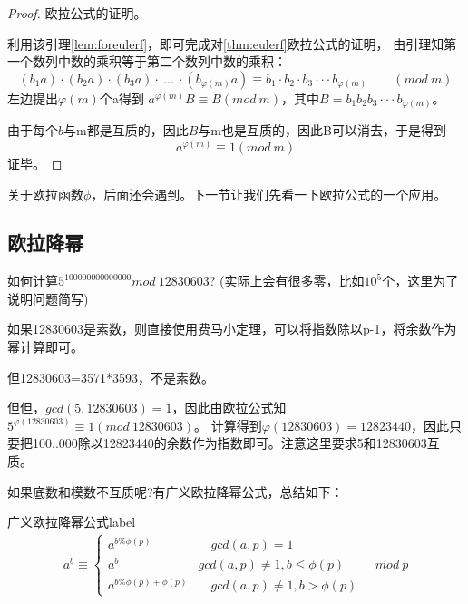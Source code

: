 \begin{proof}
欧拉公式的证明。

利用该引理\ref{lem:foreulerf}，即可完成对\ref{thm:eulerf}欧拉公式的证明，
由引理知第一个数列中数的乘积等于第二个数列中数的乘积：
$$
(b_1a)\cdot (b_2a)\cdot (b_3a)\cdot \ ...\ \cdot (b_{\varphi(m)}a) \equiv b_1\cdot b_2\cdot b_3 \cdot \cdot \cdot b_{\varphi(m)} \qquad  (mod\ m)
$$
左边提出$\varphi(m)$个a得到  $a^{\varphi(m)}B\equiv B (mod\ m)$，其中$B= b_1 b_2 b_3 \cdot \cdot \cdot b_{\varphi(m)} $。

由于每个$b$与m都是互质的，因此$B$与m也是互质的，因此B可以消去，于是得到
$$
a^{\varphi(m)}\equiv 1 (mod\ m)
$$
证毕。
\end{proof}

关于欧拉函数$\phi$，后面还会遇到。下一节让我们先看一下欧拉公式的一个应用。

\subsection{欧拉降幂}
如何计算$5^{100000000000000}mod\ 12830603$? (实际上会有很多零，比如$10^5$个，这里为了说明问题简写)

如果12830603是素数，则直接使用费马小定理，可以将指数除以p-1，将余数作为幂计算即可。

但12830603=3571*3593，不是素数。

但但，$gcd(5,12830603)=1$，因此由欧拉公式知$5^{\varphi(12830603)}\equiv 1 (mod \ 12830603)$。
计算得到$\varphi(12830603)=12823440$，因此只要把100..000除以12823440的余数作为指数即可。{\heiti 注意这里要求5和12830603互质}。

{\heiti 如果底数和模数不互质呢?有广义欧拉降幂公式}，总结如下：

\begin{theorem}{广义欧拉降幂公式}{label}
	\begin{align*}
	a^b\equiv  \left\{\begin{matrix}
	a^{b\% \phi(p)}&  \quad gcd(a,p)=1 \\
	a^b   \quad  & gcd(a,p)\neq 1,b\le \phi(p) \\
	a^{b\% \phi(p)+\phi(p)} &\quad   gcd(a,p)\neq 1,b>\phi(p)
	\end{matrix}\right. \quad {mod \ p}
	\end{align*}
\end{theorem}


